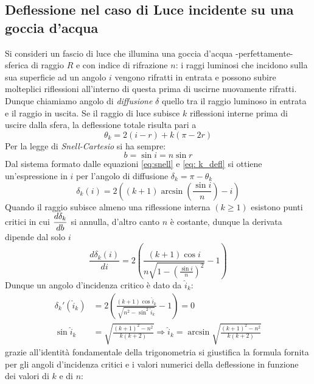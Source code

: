 \documentclass{report}[a4paper,11pt]
\begin{document}
\subsection{Deflessione nel caso di Luce incidente su una goccia d'acqua}
Si consideri un fascio di luce che illumina una goccia d'acqua -perfettamente- sferica di raggio $R$ e con indice di rifrazione $n$: i raggi luminosi che incidono sulla sua superficie ad un angolo $i$ vengono rifratti in entrata e possono subire molteplici riflessioni all'interno di questa prima di uscirne nuovamente rifratti.
Dunque chiamiamo angolo di \emph{diffusione} $\delta$ quello tra il raggio luminoso in entrata e il raggio in uscita. 
Se il raggio di luce subisce $k$ riflessioni interne prima di uscire dalla sfera, la deflessione totale risulta pari a \begin{equation}\label{eq: k_defl}
\theta_k = 2(i-r) + k (\pi - 2r)
\end{equation}
Per la legge di \emph{Snell-Cartesio} si ha sempre:
\begin{equation}\label{eq:snell}
b = \sin{i} = n \sin{r}
\end{equation}
Dal sistema formato dalle equazioni \eqref{eq:snell} e \eqref{eq: k_defl} si ottiene un'espressione in $i$ per l'angolo di diffusione $\delta_k = \pi - \theta_k$
\begin{equation}\label{eq: defl(iota)}
\delta_k(i) = 2\left( (k+1)\arcsin \left(\frac{\sin{i}}{n}\right) -i \right)
\end{equation}
Quando il raggio subisce almeno una riflessione interna $(k\geq 1)$ esistono punti critici in cui $\mathlarger{\frac{d\delta_k}{db}}$ si annulla, d'altro canto $n$ è costante, dunque la derivata dipende dal solo $i$
\begin{equation}
\frac{d \delta_k(i)}{d i} = 2 \left( \frac{(k+1) \cos{i}}{n \sqrt{1 - \left(\frac{\sin{i}}{n}\right)^2}} -1\right)
\end{equation}
Dunque un angolo d'incidenza critico è dato da $\hat{i}_k$:
\begin{align}
\delta_k'(\hat{i}_k) &= 2\left(\frac{(k+1) \cos{\hat{i}_k}}{\sqrt{n^2 - \sin^2{\hat{i}_k}}} - 1 \right) = 0 \\
\sin{\hat{i}_k} &= \sqrt{\frac{(k+1)^2 - n^2}{k(k+2)}} \Rightarrow \hat{i}_k = \arcsin{\sqrt{\frac{(k+1)^2 - n^2}{k(k+2)}}}
\end{align}
grazie all'identità fondamentale della trigonometria si giustifica la formula fornita per gli angoli d'incidenza critici e i valori numerici della deflessione in funzione dei valori di $k$ e di $n$:
\end{document}
